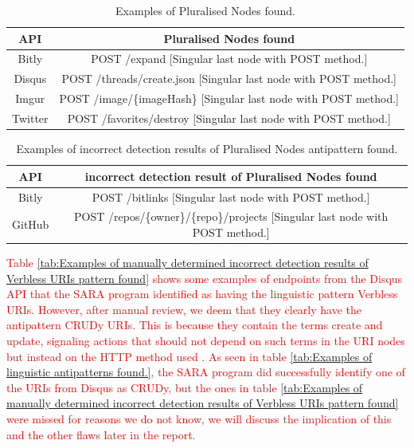 \begin{table}[htb!]
    \centering
    \begin{tabular}{|c|c|} \hline
       API  & Pluralised Nodes found \\ \hline
       Bitly & POST  /expand [Singular last node with POST method.] \\ \hline
       Disqus & POST  /threads/create.json [Singular last node with POST method.] \\ \hline
       Imgur & POST  /image/\{imageHash\} [Singular last node with POST method.] \\ \hline
       Twitter & POST  /favorites/destroy [Singular last node with POST method.] \\ \hline
    \end{tabular}
    \caption{Examples of Pluralised Nodes found.}
    \label{tab:Examples of Pluralised Nodes found.}
\end{table}

\begin{table}[htb!]
    \centering
    \begin{tabular}{|c|c|} \hline
       API  & incorrect detection result of Pluralised Nodes found \\ \hline
       Bitly & POST  /bitlinks [Singular last node with POST method.] \\ \hline
       GitHub & POST  /repos/\{owner\}/\{repo\}/projects [Singular last node with POST method.] \\ \hline
    \end{tabular}
    \caption{Examples of incorrect detection results of Pluralised Nodes antipattern found.}
    \label{tab:Examples of manually determined incorrect detection results of Pluralised Nodes found.}
\end{table}

\textcolor{red}{
Table \ref{tab:Examples of manually determined incorrect detection results of Verbless URIs pattern found} shows some examples of endpoints from the Disqus API that the SARA program identified as having the linguistic pattern Verbless URIs. However, after manual review, we deem that they clearly have the antipattern CRUDy URIs. This is because they contain the terms create and update, signaling actions that should not depend on such terms in the URI nodes but instead on the HTTP method used \cite{linguistic}. As seen in table \ref{tab:Examples of linguistic antipatterns found.}, the SARA program did successfully identify one of the URIs from Disqus as CRUDy, but the ones in table \ref{tab:Examples of manually determined incorrect detection results of Verbless URIs pattern found} were missed for reasons we do not know, we will discuss the implication of this and the other flaws later in the report.
}

